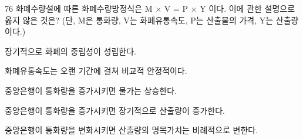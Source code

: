\begin{question}{76}
화폐수량설에 따른 화폐수량방정식은 M × V = P × Y 이다. 이에 관한 설명으로 옳지 않은 것은? (단, M은 통화량, V는 화폐유통속도, P는 산출물의 가격, Y는 산출량이다.)
\begin{choices}
  \item 장기적으로 화폐의 중립성이 성립한다.
  \item 화폐유통속도는 오랜 기간에 걸쳐 비교적 안정적이다.
  \item 중앙은행이 통화량을 증가시키면 물가는 상승한다.
  \item 중앙은행이 통화량을 증가시키면 장기적으로 산출량이 증가한다.
  \item 중앙은행이 통화량을 변화시키면 산출량의 명목가치는 비례적으로 변한다.
\end{choices}
\end{question}
